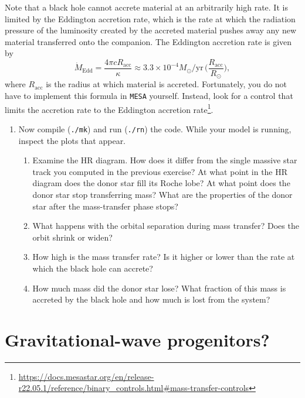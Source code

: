 \documentclass[11pt,a4paper]{article}
\begin{document}
  \noindent
  Note that a black hole cannot accrete material at an arbitrarily high rate. It is limited by the Eddington accretion rate, which is the rate at which the radiation pressure of the luminosity created by the accreted material pushes away any new material transferred onto the companion. The Eddington accretion rate is given by
  \begin{equation*}
  \dot{M}_{\mathrm{Edd}} = \frac{4\pi cR_{\mathrm{acc}}}{\kappa} \approx 3.3 \times 10^{-4} M_\odot/\mathrm{yr}\, \bigg(\frac{R_{\mathrm{acc}}}{R_\odot}\bigg),
  \end{equation*}
  where $R_{\mathrm{acc}}$ is the radius at which material is accreted. Fortunately, you do not have to implement this formula in \texttt{MESA} yourself. Instead, look for a control that limits the accretion rate to the Eddington accretion rate\footnote{\url{https://docs.mesastar.org/en/release-r22.05.1/reference/binary_controls.html\#mass-transfer-controls}}.

  \begin{enumerate}
  \addtocounter{enumi}{2}
  \item Now compile (\verb|./mk|) and run (\verb|./rn|) the code. While your model is running, inspect the plots that appear.
  \begin{enumerate}
  \item Examine the HR diagram. How does it differ from the single massive star track you computed in the previous exercise? At what point in the HR diagram does the donor star fill its Roche lobe? At what point does the donor star stop transferring mass? What are the properties of the donor star after the mass-transfer phase stops?
  \item What happens with the orbital separation during mass transfer? Does the orbit shrink or widen?
  \item How high is the mass transfer rate? Is it higher or lower than the rate at which the black hole can accrete?
  \item How much mass did the donor star lose? What fraction of this mass is accreted by the black hole and how much is lost from the system?
  \end{enumerate}

\end{enumerate}




\section{Gravitational-wave progenitors?}
\end{document}
